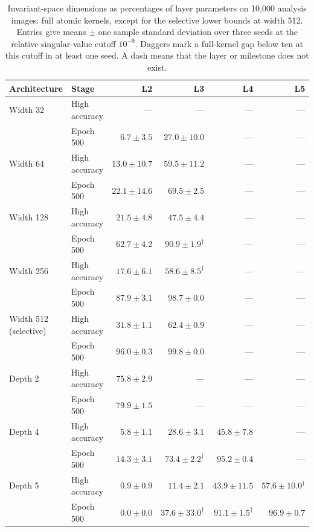 \begin{table}[!htbp]\centering
\caption{Invariant-space dimensions as percentages of layer parameters on 10,000 analysis images: full atomic kernels, except for the selective lower bounds at width 512. Entries give means $\pm$ one sample standard deviation over three seeds at the relative singular-value cutoff $10^{-9}$. Daggers mark a full-kernel gap below ten at this cutoff in at least one seed. A dash means that the layer or milestone does not exist.}
\label{tab:atomic-scaling-full}
\small\setlength{\tabcolsep}{5pt}
\begin{tabular}{llrrrr}\toprule
Architecture & Stage & L2 & L3 & L4 & L5\\\midrule
Width 32 & High accuracy & --- & --- & --- & ---\\
 & Epoch 500 & $6.7\pm3.5$ & $27.0\pm10.0$ & --- & ---\\
Width 64 & High accuracy & $13.0\pm10.7$ & $59.5\pm11.2$ & --- & ---\\
 & Epoch 500 & $22.1\pm14.6$ & $69.5\pm2.5$ & --- & ---\\
Width 128 & High accuracy & $21.5\pm4.8$ & $47.5\pm4.4$ & --- & ---\\
 & Epoch 500 & $62.7\pm4.2$ & $90.9\pm1.9^{\dagger}$ & --- & ---\\
Width 256 & High accuracy & $17.6\pm6.1$ & $58.6\pm8.5^{\dagger}$ & --- & ---\\
 & Epoch 500 & $87.9\pm3.1$ & $98.7\pm0.0$ & --- & ---\\
Width 512 (selective) & High accuracy & $31.8\pm1.1$ & $62.4\pm0.9$ & --- & ---\\
 & Epoch 500 & $96.0\pm0.3$ & $99.8\pm0.0$ & --- & ---\\
Depth 2 & High accuracy & $75.8\pm2.9$ & --- & --- & ---\\
 & Epoch 500 & $79.9\pm1.5$ & --- & --- & ---\\
Depth 4 & High accuracy & $5.8\pm1.1$ & $28.6\pm3.1$ & $45.8\pm7.8$ & ---\\
 & Epoch 500 & $14.3\pm3.1$ & $73.4\pm2.2^{\dagger}$ & $95.2\pm0.4$ & ---\\
Depth 5 & High accuracy & $0.9\pm0.9$ & $11.4\pm2.1$ & $43.9\pm11.5$ & $57.6\pm10.0^{\dagger}$\\
 & Epoch 500 & $0.0\pm0.0$ & $37.6\pm33.0^{\dagger}$ & $91.1\pm1.5^{\dagger}$ & $96.9\pm0.7$\\
\bottomrule\end{tabular}
\end{table}
